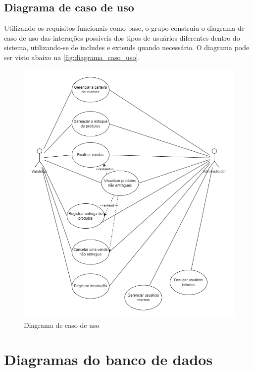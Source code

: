 \documentclass[serif, english, brazilian, oneside]{uffstex}
\begin{document}
\newpage

\subsection{Diagrama de caso de uso}

Utilizando os requisitos funcionais como base, o grupo construiu o diagrama de caso de uso das interações possíveis dos tipos de usuários diferentes dentro do sistema, utilizando-se de includes e extends quando necessário. O diagrama pode ser visto abaixo na \autoref{fig:diagrama_caso_uso}.

\begin{figure}[!htpb]
    \centering
    \caption{Diagrama de caso de uso}
    \label{fig:diagrama_caso_uso}
    \includegraphics[width=\linewidth]{imagens/diagrama_caso_uso.png}
\end{figure}

\newpage

\section{Diagramas do banco de dados}
\end{document}
